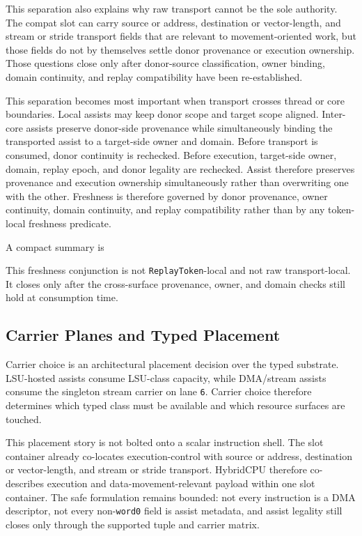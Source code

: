 \documentclass[twocolumn]{article}
\begin{document}
This separation also explains why raw transport cannot be the sole authority. The compat slot can carry source or address, destination or vector-length, and stream or stride transport fields that are relevant to movement-oriented work, but those fields do not by themselves settle donor provenance or execution ownership. Those questions close only after donor-source classification, owner binding, domain continuity, and replay compatibility have been re-established.

This separation becomes most important when transport crosses thread or core boundaries. Local assists may keep donor scope and target scope aligned. Inter-core assists preserve donor-side provenance while simultaneously binding the transported assist to a target-side owner and domain. Before transport is consumed, donor continuity is rechecked. Before execution, target-side owner, domain, replay epoch, and donor legality are rechecked. Assist therefore preserves provenance and execution ownership simultaneously rather than overwriting one with the other. Freshness is therefore governed by donor provenance, owner continuity, domain continuity, and replay compatibility rather than by any token-local freshness predicate.

A compact summary is

This freshness conjunction is not \texttt{ReplayToken}-local and not raw transport-local. It closes only after the cross-surface provenance, owner, and domain checks still hold at consumption time.


\subsection{Carrier Planes and Typed Placement}

Carrier choice is an architectural placement decision over the typed substrate. LSU-hosted assists consume LSU-class capacity, while DMA/stream assists consume the singleton stream carrier on lane \texttt{6}. Carrier choice therefore determines which typed class must be available and which resource surfaces are touched.

This placement story is not bolted onto a scalar instruction shell. The slot container already co-locates execution-control with source or address, destination or vector-length, and stream or stride transport. HybridCPU therefore co-describes execution and data-movement-relevant payload within one slot container. The safe formulation remains bounded: not every instruction is a DMA descriptor, not every non-\texttt{word0} field is assist metadata, and assist legality still closes only through the supported tuple and carrier matrix.
\end{document}
